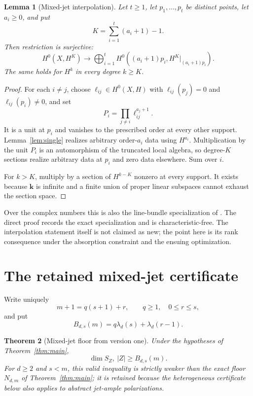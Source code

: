 \documentclass[11pt]{article}
\newtheorem{theorem}{Theorem}[section]
\newtheorem{lemma}[theorem]{Lemma}
\theoremstyle{definition}
\theoremstyle{remark}
\theoremstyle{plain}
\newcommand{\kk}{\mathbf k}
\begin{document}
\begin{lemma}[Mixed-jet interpolation]\label{lem:mixed}
Let $t\geq1$, let $p_1,\ldots,p_t$ be distinct points, let $a_i\geq0$, and put
\[
 K=\sum_{i=1}^t(a_i+1)-1.
\]
Then restriction is surjective:
\[
 H^0(X,H^K)\longrightarrow
 \bigoplus_{i=1}^t
 H^0\!\left((a_i+1)p_i,H^K|_{(a_i+1)p_i}\right).
\]
The same holds for $H^k$ in every degree $k\geq K$.
\end{lemma}

\begin{proof}
For each $i\ne j$, choose
$\ell_{ij}\in H^0(X,H)$ with
$\ell_{ij}(p_j)=0$ and $\ell_{ij}(p_i)\ne0$, and set
\[
 P_i=\prod_{j\ne i}\ell_{ij}^{a_j+1}.
\]
It is a unit at $p_i$ and vanishes to the prescribed order at every other
support.  Lemma~\ref{lem:single} realizes arbitrary order-$a_i$ data using
$H^{a_i}$.  Multiplication by the unit $P_i$ is an automorphism of the
truncated local algebra, so degree-$K$ sections realize arbitrary data at
$p_i$ and zero data elsewhere.  Sum over $i$.

For $k>K$, multiply by a section of $H^{k-K}$ nonzero at every support.
It exists because $\kk$ is infinite and a finite union of proper linear
subspaces cannot exhaust the section space.
\end{proof}

Over the complex numbers this is also the line-bundle specialization of
\cite[Proposition~2.3]{BDRS1999}.  The direct proof records the exact
specialization and is characteristic-free.  The interpolation statement itself
is not claimed as new; the point here is its rank consequence under the
absorption constraint and the ensuing optimization.

\section{The retained mixed-jet certificate}

Write uniquely
\[
 m+1=q(s+1)+r,\qquad q\geq1,\quad 0\leq r\leq s,
\]
and put
\begin{equation}\label{eq:B}
 B_{d,s}(m)=q\lambda_d(s)+\lambda_d(r-1).
\end{equation}

\begin{theorem}[Mixed-jet floor from version one]\label{thm:mixed-floor}
Under the hypotheses of Theorem~\ref{thm:main},
\[
 \dim S_Z,\ |Z|\geq B_{d,s}(m).
\]
For $d\geq2$ and $s<m$, this valid inequality is strictly weaker than the
exact floor $N_{d,m}$ of Theorem~\ref{thm:main}; it is retained because the
heterogeneous certificate below also applies to abstract jet-ample
polarizations.
\end{theorem}
\end{document}
